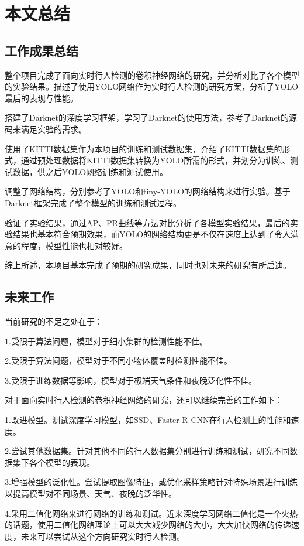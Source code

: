 \chapter{本文总结}

\section{工作成果总结}{
	整个项目完成了面向实时行人检测的卷积神经网络的研究，并分析对比了各个模型的实验结果。描述了使用YOLO网络作为实时行人检测的研究方案，分析了YOLO最后的表现与性能。

	搭建了Darknet的深度学习框架，学习了Darknet的使用方法，参考了Darknet的源码来满足实验的需求。

	使用了KITTI数据集作为本项目的训练和测试数据集，介绍了KITTI数据集的形式，通过预处理数据将KITTI数据集转换为YOLO所需的形式，并划分为训练、测试数据，供之后YOLO网络训练和测试使用。

	调整了网络结构，分别参考了YOLO和tiny-YOLO的网络结构来进行实验。基于Darknet框架完成了整个模型的训练和测试过程。

	验证了实验结果，通过AP、PR曲线等方法对比分析了各模型实验结果，最后的实验结果也基本符合预期效果，而YOLO的网络结构更是不仅在速度上达到了令人满意的程度，模型性能也相对较好。

	综上所述，本项目基本完成了预期的研究成果，同时也对未来的研究有所启迪。
}

\section{未来工作}{
	当前研究的不足之处在于：

	1.受限于算法问题，模型对于细小集群的检测性能不佳。

	2.受限于算法问题，模型对于不同小物体覆盖时检测性能不佳。

	3.受限于训练数据等影响，模型对于极端天气条件和夜晚泛化性不佳。

	对于面向实时行人检测的卷积神经网络的研究，还可以继续完善的工作如下：

	1.改进模型。测试深度学习模型，如SSD、Faster R-CNN在行人检测上的性能和速度。

	2.尝试其他数据集。针对其他不同的行人数据集分别进行训练和测试，研究不同数据集下各个模型的表现。

	3.增强模型的泛化性。尝试提取图像特征，或优化采样策略针对特殊场景进行训练以提高模型对不同场景、天气、夜晚的泛华性。

	4.采用二值化网络来进行网络的训练和测试\cite{RAR}。近来深度学习网络二值化是一个火热的话题，使用二值化网络理论上可以大大减少网络的大小，大大加快网络的传递速度，未来可以尝试从这个方向研究实时行人检测。
}

